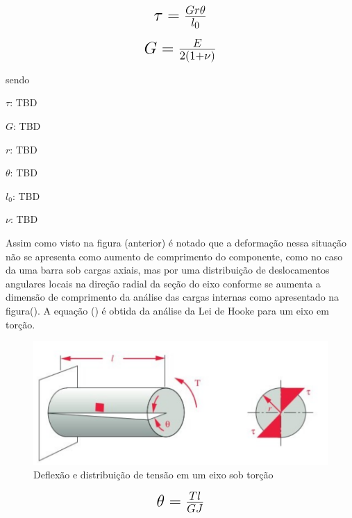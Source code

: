 \begin{equation}\label{eq:Eq_160}%
\mbox{\fontsize{17.28}{21.6}\selectfont\( %
\tau = \frac{Gr\theta}{l_0}
\)} %
\end{equation}

\hfill

\begin{equation}\label{eq:Eq_170}%
\mbox{\fontsize{17.28}{21.6}\selectfont\( %
G = \frac{E}{2(1+\nu )}
\)} %
\end{equation}

sendo

$\tau $: TBD

$G$: TBD

$r$: TBD

$\theta$: TBD

$l_0$: TBD

$\nu$: TBD


\hfill

Assim como visto na figura (anterior) é notado que a deformação nessa situação não se apresenta como aumento de comprimento do componente, como no caso da uma barra sob cargas axiais, mas por uma distribuição de deslocamentos angulares locais na direção radial da seção do eixo conforme se aumenta a dimensão de comprimento da análise das cargas internas como apresentado na figura(). A equação () é obtida da análise da Lei de Hooke para um eixo em torção.

\begin{figure}[htb]
	\caption{\label{fig:1050} Deflexão e distribuição de tensão em um eixo sob torção}
	\begin{center}
		\includegraphics[width=\textwidth]{pictures/1050.png}
	\end{center}
\end{figure}

\begin{equation}\label{eq:Eq_180}%
\mbox{\fontsize{17.28}{21.6}\selectfont\( %
\theta = \frac{Tl}{GJ}
\)} %
\end{equation}

